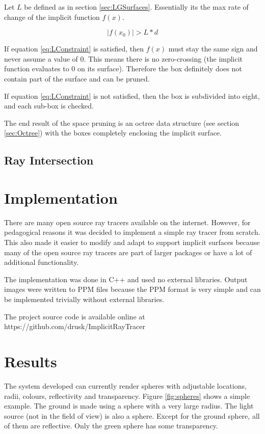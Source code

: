 \documentclass[conference]{acmsiggraph}
\begin{document}
Let $L$ be defined as in section \ref{sec:LGSurfaces}.  Essentially its
the max rate of change of the implicit function $f(x)$.  

\begin{equation}
	\label{eq:LConstraint}
	|f(x_0)| > L * d
\end{equation}

If equation \ref{eq:LConstraint} is satisfied, then $f(x)$ must stay 
the same sign and never assume a value of 0.  
This means there is no zero-crossing (the implicit function
evaluates to 0 on its surface).  Therefore the box definitely does not
contain part of the surface and can be pruned.  

If equation \ref{eq:LConstraint} is not satisfied, then the box is 
subdivided into eight, and each sub-box is checked.

The end result of the space pruning is an octree data structure 
(see section \ref{sec:Octree}) with the boxes completely enclosing the
implicit surface.

\subsection{Ray Intersection}
\label{sec:RayIntersection}

\section{Implementation}

There are many open source ray tracers available on the internet.  However, 
for pedagogical reasons it was decided to implement a simple ray tracer from 
scratch.  This also made it easier to modify and adapt to support implicit
surfaces because many of the open source ray tracers are part of larger 
packages or have a lot of additional functionality.

The implementation was done in C++ and used no external libraries.  Output 
images were written to PPM \cite{PPM} files because the PPM format is 
very simple and can be implemented trivially without external libraries.

The project source code is available online at 
https://github.com/drusk/ImplicitRayTracer

\section{Results}

The system developed can currently render spheres with adjustable locations,
radii, colours, reflectivity and transparency.  Figure \ref{fig:spheres} shows a
simple example.  The ground is made using a sphere with a very large radius.
The light source (not in the field of view) is also a sphere.  Except for the
ground sphere, all of them are reflective.  Only the green sphere has some
transparency.
\end{document}
